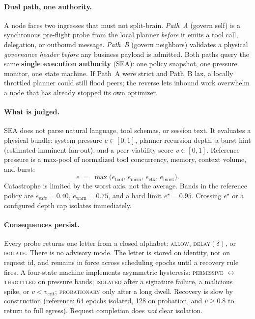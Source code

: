\documentclass{article}
\begin{document}
\paragraph{Dual path, one authority.}
A node faces two ingresses that must not split-brain.
\emph{Path~A} (govern self) is a synchronous pre-flight probe from the local planner \emph{before} it emits a tool call, delegation, or outbound message.
\emph{Path~B} (govern neighbors) validates a physical \emph{governance header} \emph{before} any business payload is admitted.
Both paths query the same \textbf{single execution authority} (SEA): one policy snapshot, one pressure monitor, one state machine.
If Path~A were strict and Path~B lax, a locally throttled planner could still flood peers; the reverse lets inbound work overwhelm a node that has already stopped its own optimizer.

\paragraph{What is judged.}
SEA does not parse natural language, tool schemas, or session text.
It evaluates a physical bundle: system pressure $e\in[0,1]$, planner recursion depth, a burst hint (estimated imminent fan-out), and a peer viability score $v\in[0,1]$.
Reference pressure is a max-pool of normalized tool concurrency, memory, context volume, and burst:
\begin{equation}
    e \;=\; \max\!\bigl(e_{\mathrm{tool}},\, e_{\mathrm{mem}},\, e_{\mathrm{ctx}},\, e_{\mathrm{burst}}\bigr).
    \label{eq:entropy}
\end{equation}
Catastrophe is limited by the worst axis, not the average.
Bands in the reference policy are $e_{\mathrm{safe}}=0.40$, $e_{\mathrm{warn}}=0.75$, and a hard limit $e^{\star}=0.95$.
Crossing $e^{\star}$ or a configured depth cap isolates immediately.

\paragraph{Consequences persist.}
Every probe returns one letter from a closed alphabet: \textsc{allow}, \textsc{delay}$(\delta)$, or \textsc{isolate}.
There is no advisory mode.
The letter is stored on identity, not on request id, and remains in force across scheduling epochs until a recovery rule fires.
A four-state machine implements asymmetric hysteresis: \textsc{permissive} $\leftrightarrow$ \textsc{throttled} on pressure bands; \textsc{isolated} after a signature failure, a malicious spike, or $v<v_{\mathrm{crit}}$; \textsc{probationary} only after a long dwell.
Recovery is slow by construction (reference: 64 epochs isolated, 128 on probation, and $v\ge 0.8$ to return to full egress).
Request completion does \emph{not} clear isolation.
\end{document}
